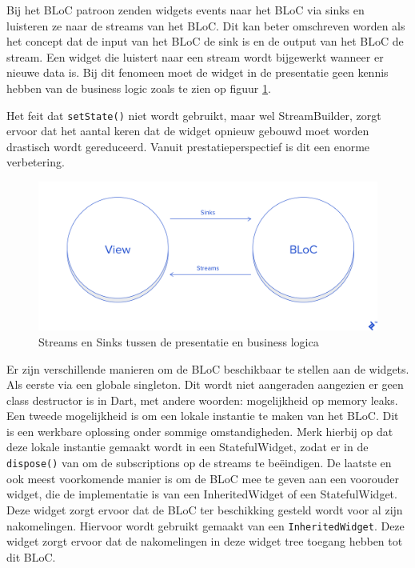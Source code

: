 Bij het BLoC patroon zenden widgets events naar het BLoC via sinks en luisteren ze naar de streams van het BLoC.
Dit kan beter omschreven worden als het concept dat de input van het BLoC de sink is en de output van het BLoC de stream. Een widget die luistert naar een stream wordt bijgewerkt wanneer er nieuwe data is. Bij dit fenomeen moet de widget in de presentatie geen kennis hebben van de business logic zoals te zien op figuur \ref{fig:bloc-pattern-streams-sinks}. 

Het feit dat \verb|setState()| niet wordt gebruikt, maar wel StreamBuilder, zorgt ervoor dat het aantal keren dat de widget opnieuw gebouwd moet worden drastisch wordt gereduceerd.
Vanuit prestatieperspectief is dit een enorme verbetering.

\begin{figure}[H]
    \centering
    \includegraphics[width=\figureWidthModifier\linewidth]{img/stand-van-zaken/bloc-pattern-streams-sinks.png}
    \caption{Streams en Sinks tussen de presentatie en business logica \autocite{Perutovic2018}}
    \label{fig:bloc-pattern-streams-sinks}
\end{figure}

Er zijn verschillende manieren om de BLoC beschikbaar te stellen aan de widgets. Als eerste via een globale singleton. Dit wordt niet aangeraden aangezien er geen class destructor is in Dart, met andere woorden: mogelijkheid op memory leaks.
Een tweede mogelijkheid is om een lokale instantie te maken van het BLoC. Dit is een werkbare oplossing onder sommige omstandigheden. Merk hierbij op dat deze lokale instantie gemaakt wordt in een StatefulWidget, zodat er in de \verb|dispose()| van om de subscriptions op de streams te beëindigen.
De laatste en ook meest voorkomende manier is om de BLoC mee te geven aan een voorouder widget, die de implementatie is van een InheritedWidget of een StatefulWidget.  Deze widget zorgt ervoor dat de BLoC ter beschikking gesteld wordt voor al zijn nakomelingen. Hiervoor wordt gebruikt gemaakt van een \verb|InheritedWidget|. Deze widget zorgt ervoor dat de nakomelingen in deze widget tree toegang hebben tot dit BLoC.

